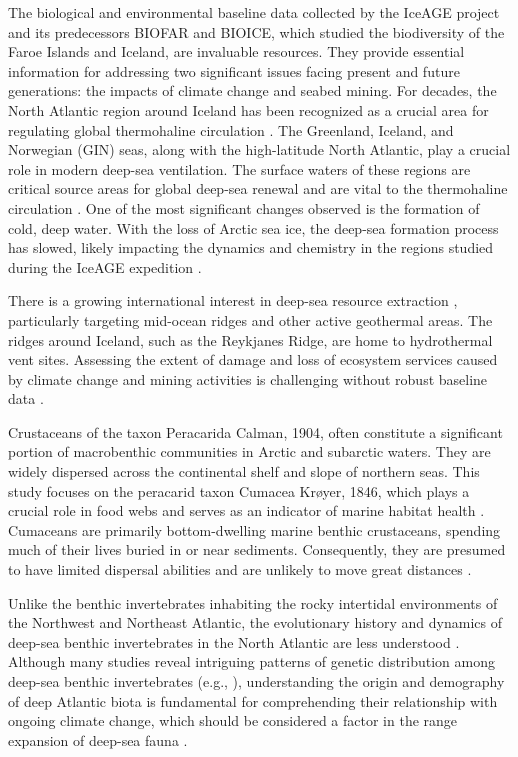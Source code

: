 The biological and environmental baseline data collected by the IceAGE project and its predecessors BIOFAR and BIOICE, which studied the biodiversity of the Faroe Islands and Iceland, are invaluable resources. They provide essential information for addressing two significant issues facing present and future generations: the impacts of climate change and seabed mining. For decades, the North Atlantic region around Iceland has been recognized as a crucial area for regulating global thermohaline circulation \citep{meisner_prefacebiodiversity_2018}. The Greenland, Iceland, and Norwegian (GIN) seas, along with the high-latitude North Atlantic, play a crucial role in modern deep-sea ventilation. The surface waters of these regions are critical source areas for global deep-sea renewal and are vital to the thermohaline circulation \citep{johannessen_relationship_1994}. One of the most significant changes observed is the formation of cold, deep water. With the loss of Arctic sea ice, the deep-sea formation process has slowed, likely impacting the dynamics and chemistry in the regions studied during the IceAGE expedition \citep{meisner_prefacebiodiversity_2018}.

There is a growing international interest in deep-sea resource extraction \citep{mengerink_call_2014}, particularly targeting mid-ocean ridges and other active geothermal areas. The ridges around Iceland, such as the Reykjanes Ridge, are home to hydrothermal vent sites. Assessing the extent of damage and loss of ecosystem services caused by climate change and mining activities is challenging without robust baseline data \citep{meisner_prefacebiodiversity_2018}.

Crustaceans of the taxon Peracarida Calman, 1904, often constitute a significant portion of macrobenthic communities in Arctic and subarctic waters. They are widely dispersed across the continental shelf and slope of northern seas. This study focuses on the peracarid taxon Cumacea Krøyer, 1846, which plays a crucial role in food webs and serves as an indicator of marine habitat health \citep{stransky_diversity_2010}. Cumaceans are primarily bottom-dwelling marine benthic crustaceans, spending much of their lives buried in or near sediments. Consequently, they are presumed to have limited dispersal abilities and are unlikely to move great distances \citep{uhlir_adding_2021}.

Unlike the benthic invertebrates inhabiting the rocky intertidal environments of the Northwest and Northeast Atlantic, the evolutionary history and dynamics of deep-sea benthic invertebrates in the North Atlantic are less understood \citep{jennings_phylogeographic_2014}. Although many studies reveal intriguing patterns of genetic distribution among deep-sea benthic invertebrates (e.g., \citep{wilson_historical_1998, havermans_genetic_2013}), understanding the origin and demography of deep Atlantic biota is fundamental for comprehending their relationship with ongoing climate change, which should be considered a factor in the range expansion of deep-sea fauna \citep{jennings_phylogeographic_2014}.


